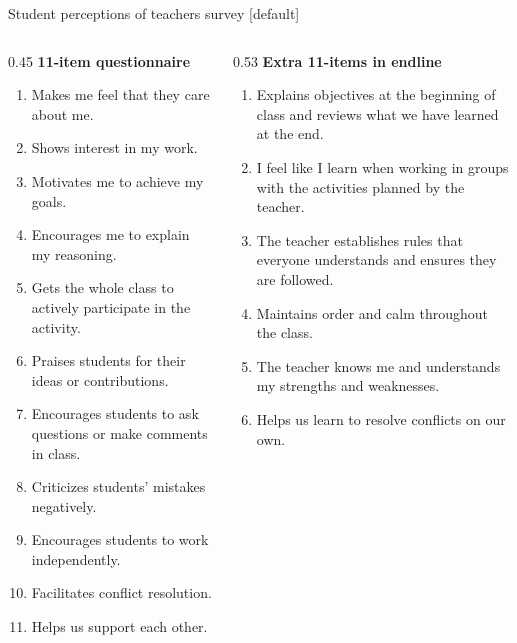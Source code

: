 \documentclass[xcolor=usenames,dvipsnames]{beamer}
\begin{document}
\begin{frame}{Student perceptions of teachers survey}\label{perception}
[default]
\begin{columns}[T,onlytextwidth]
  \begin{column}{0.45\textwidth}
    \textbf{\scriptsize 11-item questionnaire}
    \tiny
    \begin{enumerate}
      \setlength{\itemsep}{0pt}
      \setlength{\parskip}{0pt}
      \setlength{\parsep}{0pt}
      \item Makes me feel that they care about me.
      \item Shows interest in my work.
      \item Motivates me to achieve my goals.
      \item Encourages me to explain my reasoning.
      \item Gets the whole class to actively participate in the activity.
      \item Praises students for their ideas or contributions.
      \item Encourages students to ask questions or make comments in class.
      \item Criticizes students' mistakes negatively.
      \item Encourages students to work independently.
      \item Facilitates conflict resolution.
      \item Helps us support each other.
    \end{enumerate}
  \end{column}
  \begin{column}{0.53\textwidth}
    \textbf{\scriptsize Extra 11-items in endline}
    \tiny
    \begin{enumerate}
      \setlength{\itemsep}{0pt}
      \setlength{\parskip}{0pt}
      \setlength{\parsep}{0pt}
      \item Explains objectives at the beginning of class and reviews what we have learned at the end.
      \item I feel like I learn when working in groups with the activities planned by the teacher.
      \item The teacher establishes rules that everyone understands and ensures they are followed.
      \item Maintains order and calm throughout the class.
      \item The teacher knows me and understands my strengths and weaknesses.
      \item Helps us learn to resolve conflicts on our own.

\end{enumerate}
\end{column}
\end{columns}
\end{frame}
\end{document}
